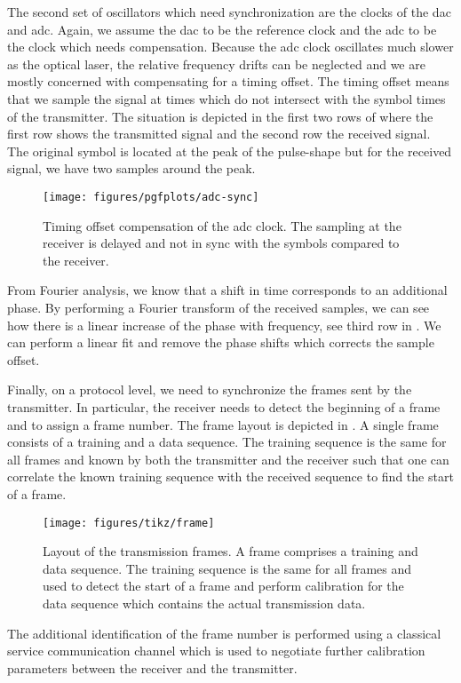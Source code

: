 The second set of oscillators which need synchronization are the clocks of the \gls{dac} and \gls{adc}.
Again, we assume the \gls{dac} to be the reference clock and the \gls{adc} to be the clock which needs compensation.
Because the \gls{adc} clock oscillates much slower as the optical laser, the relative frequency drifts can be neglected and we are mostly concerned with compensating for a timing offset.
The timing offset means that we sample the signal at times which do not intersect with the symbol times of the transmitter.
The situation is depicted in the first two rows of  where the first row shows the transmitted signal and the second row the received signal.
The original symbol is located at the peak of the pulse-shape but for the received signal, we have two samples around the peak.
\begin{figure}[htb]
	\centering
	\texttt{[image: figures/pgfplots/adc-sync]}
	\caption{Timing offset compensation of the \gls{adc} clock. The sampling at the receiver is delayed and not in sync with the symbols compared to the receiver.}\label{fig:adc_sync}
\end{figure}
From Fourier analysis, we know that a shift in time corresponds to an additional phase.
By performing a Fourier transform of the received samples, we can see how there is a linear increase of the phase with frequency, see third row in .
We can perform a linear fit and remove the phase shifts which corrects the sample offset.

Finally, on a protocol level, we need to synchronize the frames sent by the transmitter.
In particular, the receiver needs to detect the beginning of a frame and to assign a frame number.
The frame layout is depicted in .
A single frame consists of a training and a data sequence.
The training sequence is the same for all frames and known by both the transmitter and the receiver such that one can correlate the known training sequence with the received sequence to find the start of a frame.
\begin{figure}[htb]
	\centering
	\texttt{[image: figures/tikz/frame]}
	\caption{Layout of the transmission frames. A frame comprises a training and data sequence. The training sequence is the same for all frames and used to detect the start of a frame and perform calibration for the data sequence which contains the actual transmission data.}\label{fig:frame}
\end{figure}
The additional identification of the frame number is performed using a classical service communication channel which is used to negotiate further calibration parameters between the receiver and the transmitter.
